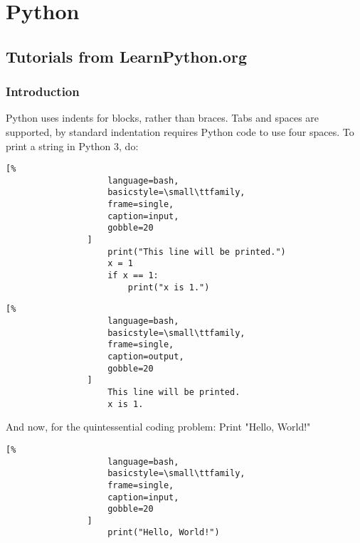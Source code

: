 \documentclass[crop=false,class=article,oneside]{standalone}
\begin{document}
    \ifx\ifcoursesprogrammingtutorials\undefined
        \section*{Python}
        \setcounter{section}{1}
    \fi
    \subsection{Tutorials from LearnPython.org}
        \subsubsection{Introduction}
            Python uses indents for blocks, rather than braces.
            Tabs and spaces are supported, by standard indentation
            requires Python code to use four spaces.
            To print a string in Python 3, do:
            \newline
            \begin{minipage}[t]{.48\textwidth}
                \centering
                \begin{lstlisting}[%
                    language=bash,
                    basicstyle=\small\ttfamily,
                    frame=single,
                    caption=input,
                    gobble=20
                ]
                    print("This line will be printed.")
                    x = 1
                    if x == 1:
                        print("x is 1.")
                \end{lstlisting}
            \end{minipage}
            \hfill
            \begin{minipage}[t]{.48\textwidth}
                \centering
                \begin{lstlisting}[%
                    language=bash,
                    basicstyle=\small\ttfamily,
                    frame=single,
                    caption=output,
                    gobble=20
                ]
                    This line will be printed.
                    x is 1.
                \end{lstlisting}
            \end{minipage}
            And now, for the quintessential coding problem:
            Print "Hello, World!"\newline
            \begin{minipage}[t]{.48\textwidth}
                \centering
                \begin{lstlisting}[%
                    language=bash,
                    basicstyle=\small\ttfamily,
                    frame=single,
                    caption=input,
                    gobble=20
                ]
                    print("Hello, World!")
                \end{lstlisting}
            \end{minipage}
\end{document}
